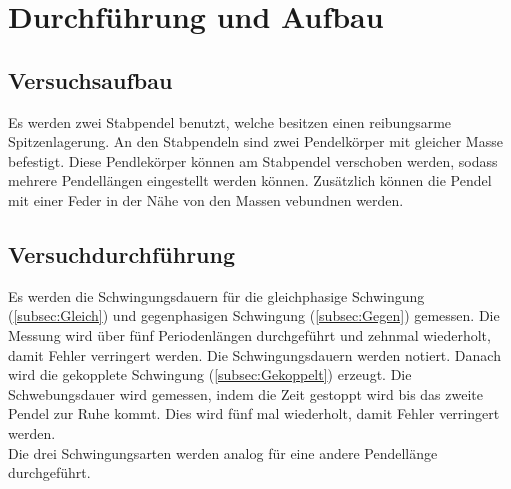 \section{Durchführung und Aufbau}
\label{sec:Durchführung}
\subsection{Versuchsaufbau} %
\label{sub:Versuchsaufbau}
Es werden zwei Stabpendel benutzt, welche besitzen einen reibungsarme Spitzenlagerung.
An den Stabpendeln sind zwei Pendelkörper mit gleicher Masse befestigt.
Diese Pendlekörper können am Stabpendel verschoben werden, sodass mehrere Pendellängen eingestellt werden können.
Zusätzlich können die Pendel mit einer Feder in der Nähe von den Massen vebundnen werden.

\subsection{Versuchdurchführung} %
\label{sub:Versuchdurchführung}
Es werden die Schwingungsdauern für die gleichphasige Schwingung (\autoref{subsec:Gleich}) und gegenphasigen Schwingung (\autoref{subsec:Gegen}) gemessen.
Die Messung wird über fünf Periodenlängen durchgeführt und zehnmal wiederholt, damit Fehler verringert werden.
Die Schwingungsdauern werden notiert.
Danach wird die gekopplete Schwingung (\autoref{subsec:Gekoppelt}) erzeugt.
Die Schwebungsdauer wird gemessen, indem die Zeit gestoppt wird bis das zweite Pendel zur Ruhe kommt. 
Dies wird fünf mal wiederholt, damit Fehler verringert werden. \\
Die drei Schwingungsarten werden analog für eine andere Pendellänge durchgeführt.

